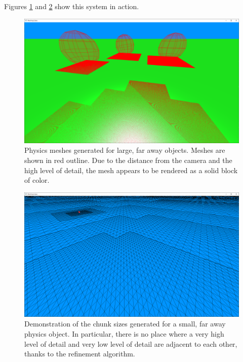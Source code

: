 \documentclass{article}
\begin{document}
Figures \ref{fig:meshes2} and \ref{fig:meshes3} show this system in action.

\begin{figure}[H]
  \includegraphics[width=\textwidth]{meshes2.png}
  \caption{Physics meshes generated for large, far away objects. Meshes are shown in red outline. Due to the distance from the camera and the high level of detail, the mesh appears to be rendered as a solid block of color.}
  \label{fig:meshes2}
\end{figure}

\begin{figure}[H]
  \includegraphics[width=\textwidth]{meshes3.png}
  \caption{Demonstration of the chunk sizes generated for a small, far away physics object. In particular, there is no place where a very high level of detail and very low level of detail are adjacent to each other, thanks to the refinement algorithm.}
  \label{fig:meshes3}
\end{figure}

\end{document}
